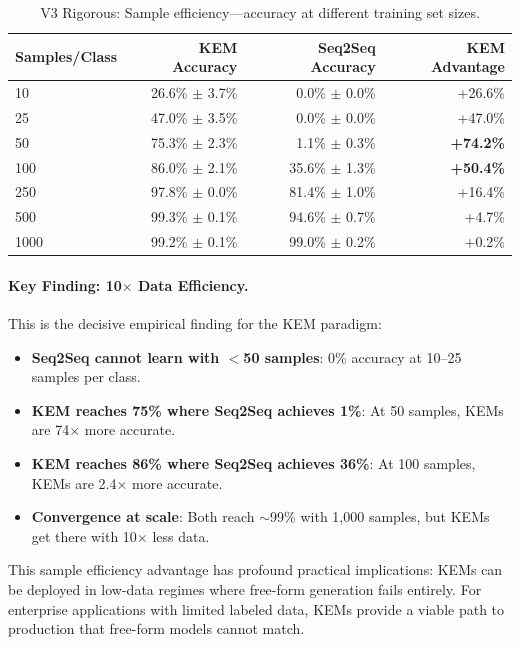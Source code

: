 \documentclass[11pt]{article}
\begin{document}
\begin{table}[h]
\centering
\caption{V3 Rigorous: Sample efficiency---accuracy at different training set sizes.}
\label{tab:v3_sample_efficiency}
\begin{tabular}{lrrr}
\toprule
Samples/Class & KEM Accuracy & Seq2Seq Accuracy & \textbf{KEM Advantage} \\
\midrule
10 & 26.6\% $\pm$ 3.7\% & 0.0\% $\pm$ 0.0\% & +26.6\% \\
25 & 47.0\% $\pm$ 3.5\% & 0.0\% $\pm$ 0.0\% & +47.0\% \\
50 & 75.3\% $\pm$ 2.3\% & 1.1\% $\pm$ 0.3\% & \textbf{+74.2\%} \\
100 & 86.0\% $\pm$ 2.1\% & 35.6\% $\pm$ 1.3\% & \textbf{+50.4\%} \\
250 & 97.8\% $\pm$ 0.0\% & 81.4\% $\pm$ 1.0\% & +16.4\% \\
500 & 99.3\% $\pm$ 0.1\% & 94.6\% $\pm$ 0.7\% & +4.7\% \\
1000 & 99.2\% $\pm$ 0.1\% & 99.0\% $\pm$ 0.2\% & +0.2\% \\
\bottomrule
\end{tabular}
\end{table}

\paragraph{Key Finding: 10$\times$ Data Efficiency.}
This is the decisive empirical finding for the KEM paradigm:
\begin{itemize}[leftmargin=*]
  \item \textbf{Seq2Seq cannot learn with $<$50 samples}: 0\% accuracy at 10--25 samples per class.
  \item \textbf{KEM reaches 75\% where Seq2Seq achieves 1\%}: At 50 samples, KEMs are 74$\times$ more accurate.
  \item \textbf{KEM reaches 86\% where Seq2Seq achieves 36\%}: At 100 samples, KEMs are 2.4$\times$ more accurate.
  \item \textbf{Convergence at scale}: Both reach $\sim$99\% with 1{,}000 samples, but KEMs get there with 10$\times$ less data.
\end{itemize}

This sample efficiency advantage has profound practical implications: KEMs can be deployed in low-data regimes where free-form generation fails entirely.
For enterprise applications with limited labeled data, KEMs provide a viable path to production that free-form models cannot match.
\end{document}
